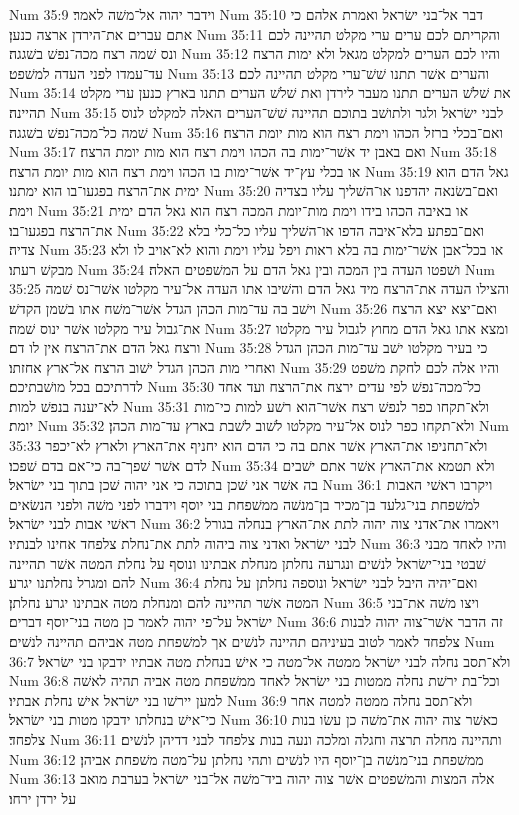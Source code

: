 Num 35:9  וידבר יהוה אל־משׁה לאמר׃
Num 35:10  דבר אל־בני ישׂראל ואמרת אלהם כי אתם עברים את־הירדן ארצה כנען׃
Num 35:11  והקריתם לכם ערים ערי מקלט תהיינה לכם ונס שׁמה רצח מכה־נפשׁ בשׁגגה׃
Num 35:12  והיו לכם הערים למקלט מגאל ולא ימות הרצח עד־עמדו לפני העדה למשׁפט׃
Num 35:13  והערים אשׁר תתנו שׁשׁ־ערי מקלט תהיינה לכם׃
Num 35:14  את שׁלשׁ הערים תתנו מעבר לירדן ואת שׁלשׁ הערים תתנו בארץ כנען ערי מקלט תהיינה׃
Num 35:15  לבני ישׂראל ולגר ולתושׁב בתוכם תהיינה שׁשׁ־הערים האלה למקלט לנוס שׁמה כל־מכה־נפשׁ בשׁגגה׃
Num 35:16  ואם־בכלי ברזל הכהו וימת רצח הוא מות יומת הרצח׃
Num 35:17  ואם באבן יד אשׁר־ימות בה הכהו וימת רצח הוא מות יומת הרצח׃
Num 35:18  או בכלי עץ־יד אשׁר־ימות בו הכהו וימת רצח הוא מות יומת הרצח׃
Num 35:19  גאל הדם הוא ימית את־הרצח בפגעו־בו הוא ימתנו׃
Num 35:20  ואם־בשׂנאה יהדפנו או־השׁליך עליו בצדיה וימת׃
Num 35:21  או באיבה הכהו בידו וימת מות־יומת המכה רצח הוא גאל הדם ימית את־הרצח בפגעו־בו׃
Num 35:22  ואם־בפתע בלא־איבה הדפו או־השׁליך עליו כל־כלי בלא צדיה׃
Num 35:23  או בכל־אבן אשׁר־ימות בה בלא ראות ויפל עליו וימת והוא לא־אויב לו ולא מבקשׁ רעתו׃
Num 35:24  ושׁפטו העדה בין המכה ובין גאל הדם על המשׁפטים האלה׃
Num 35:25  והצילו העדה את־הרצח מיד גאל הדם והשׁיבו אתו העדה אל־עיר מקלטו אשׁר־נס שׁמה וישׁב בה עד־מות הכהן הגדל אשׁר־משׁח אתו בשׁמן הקדשׁ׃
Num 35:26  ואם־יצא יצא הרצח את־גבול עיר מקלטו אשׁר ינוס שׁמה׃
Num 35:27  ומצא אתו גאל הדם מחוץ לגבול עיר מקלטו ורצח גאל הדם את־הרצח אין לו דם׃
Num 35:28  כי בעיר מקלטו ישׁב עד־מות הכהן הגדל ואחרי מות הכהן הגדל ישׁוב הרצח אל־ארץ אחזתו׃
Num 35:29  והיו אלה לכם לחקת משׁפט לדרתיכם בכל מושׁבתיכם׃
Num 35:30  כל־מכה־נפשׁ לפי עדים ירצח את־הרצח ועד אחד לא־יענה בנפשׁ למות׃
Num 35:31  ולא־תקחו כפר לנפשׁ רצח אשׁר־הוא רשׁע למות כי־מות יומת׃
Num 35:32  ולא־תקחו כפר לנוס אל־עיר מקלטו לשׁוב לשׁבת בארץ עד־מות הכהן׃
Num 35:33  ולא־תחניפו את־הארץ אשׁר אתם בה כי הדם הוא יחניף את־הארץ ולארץ לא־יכפר לדם אשׁר שׁפך־בה כי־אם בדם שׁפכו׃
Num 35:34  ולא תטמא את־הארץ אשׁר אתם ישׁבים בה אשׁר אני שׁכן בתוכה כי אני יהוה שׁכן בתוך בני ישׂראל׃
Num 36:1  ויקרבו ראשׁי האבות למשׁפחת בני־גלעד בן־מכיר בן־מנשׁה ממשׁפחת בני יוסף וידברו לפני משׁה ולפני הנשׂאים ראשׁי אבות לבני ישׂראל׃
Num 36:2  ויאמרו את־אדני צוה יהוה לתת את־הארץ בנחלה בגורל לבני ישׂראל ואדני צוה ביהוה לתת את־נחלת צלפחד אחינו לבנתיו׃
Num 36:3  והיו לאחד מבני שׁבטי בני־ישׂראל לנשׁים ונגרעה נחלתן מנחלת אבתינו ונוסף על נחלת המטה אשׁר תהיינה להם ומגרל נחלתנו יגרע׃
Num 36:4  ואם־יהיה היבל לבני ישׂראל ונוספה נחלתן על נחלת המטה אשׁר תהיינה להם ומנחלת מטה אבתינו יגרע נחלתן׃
Num 36:5  ויצו משׁה את־בני ישׂראל על־פי יהוה לאמר כן מטה בני־יוסף דברים׃
Num 36:6  זה הדבר אשׁר־צוה יהוה לבנות צלפחד לאמר לטוב בעיניהם תהיינה לנשׁים אך למשׁפחת מטה אביהם תהיינה לנשׁים׃
Num 36:7  ולא־תסב נחלה לבני ישׂראל ממטה אל־מטה כי אישׁ בנחלת מטה אבתיו ידבקו בני ישׂראל׃
Num 36:8  וכל־בת ירשׁת נחלה ממטות בני ישׂראל לאחד ממשׁפחת מטה אביה תהיה לאשׁה למען יירשׁו בני ישׂראל אישׁ נחלת אבתיו׃
Num 36:9  ולא־תסב נחלה ממטה למטה אחר כי־אישׁ בנחלתו ידבקו מטות בני ישׂראל׃
Num 36:10  כאשׁר צוה יהוה את־משׁה כן עשׂו בנות צלפחד׃
Num 36:11  ותהיינה מחלה תרצה וחגלה ומלכה ונעה בנות צלפחד לבני דדיהן לנשׁים׃
Num 36:12  ממשׁפחת בני־מנשׁה בן־יוסף היו לנשׁים ותהי נחלתן על־מטה משׁפחת אביהן׃
Num 36:13  אלה המצות והמשׁפטים אשׁר צוה יהוה ביד־משׁה אל־בני ישׂראל בערבת מואב על ירדן ירחו׃


